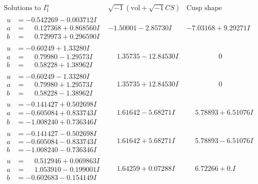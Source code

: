 \documentclass[1p]{elsarticle_modified}
\theoremstyle{definition}
\newcommand{\I}{\sqrt{-1}}
\begin{document}
$$\begin{array}{c|c|c}
\text{Solutions to }I^u_{1}& \I (\text{vol} + \sqrt{-1}CS) & \text{Cusp shape}\\
 \hline 
\begin{aligned}
u &= -0.542269 - 0.003712 I \\
a &= \phantom{-}0.127368 + 0.868560 I \\
b &= \phantom{-}0.729973 + 0.296590 I\end{aligned}
 & -1.50001 - 2.85730 I & -7.03168 + 9.29271 I \\ \hline\begin{aligned}
u &= -0.60249 + 1.33280 I \\
a &= \phantom{-}0.79980 - 1.29573 I \\
b &= \phantom{-}0.58228 + 1.38962 I\end{aligned}
 & \phantom{-}1.35735 - 12.84530 I & \phantom{-0.000000 } 0 \\ \hline\begin{aligned}
u &= -0.60249 - 1.33280 I \\
a &= \phantom{-}0.79980 + 1.29573 I \\
b &= \phantom{-}0.58228 - 1.38962 I\end{aligned}
 & \phantom{-}1.35735 + 12.84530 I & \phantom{-0.000000 } 0 \\ \hline\begin{aligned}
u &= -0.141427 + 0.502698 I \\
a &= -0.605084 + 0.833743 I \\
b &= -1.008240 + 0.736346 I\end{aligned}
 & \phantom{-}1.61642 - 5.68271 I & \phantom{-}5.78893 + 6.51076 I \\ \hline\begin{aligned}
u &= -0.141427 - 0.502698 I \\
a &= -0.605084 - 0.833743 I \\
b &= -1.008240 - 0.736346 I\end{aligned}
 & \phantom{-}1.61642 + 5.68271 I & \phantom{-}5.78893 - 6.51076 I \\ \hline\begin{aligned}
u &= \phantom{-}0.512946 + 0.069863 I \\
a &= \phantom{-}1.053910 - 0.199001 I \\
b &= -0.602683 - 0.154149 I\end{aligned}
 & \phantom{-}1.64259 + 0.07288 I & \phantom{-}6.72266 + 0. I\phantom{ +0.000000I} \\ \hline\begin{aligned}

\end{aligned}
\end{array}$$
\end{document}
